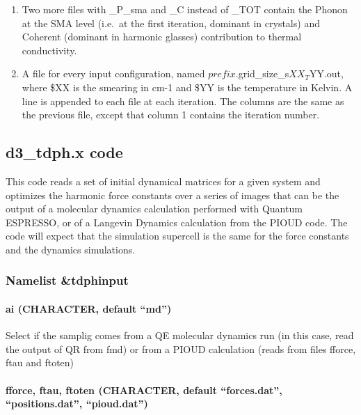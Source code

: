 \documentclass[
]{article}
\providecommand{\tightlist}{%
  \setlength{\itemsep}{0pt}\setlength{\parskip}{0pt}}
\begin{document}
\begin{enumerate}
\def\labelenumi{\arabic{enumi}.}
\setcounter{enumi}{1}
\tightlist
\item
  Two more files with \_P\_sma and \_C instead of \_TOT contain the
  Phonon at the SMA level (i.e.~at the first iteration, dominant in
  crystals) and Coherent (dominant in harmonic glasses) contribution to
  thermal conductivity.
\item
  A file for every input configuration, named
  \(prefix.\)grid\_size\_s\(XX_T\)YY.out, where \$XX is the smearing in
  cm-1 and \$YY is the temperature in Kelvin. A line is appended to each
  file at each iteration. The columns are the same as the previous file,
  except that column 1 contains the iteration number.
\end{enumerate}

\hypertarget{d3_tdph.x-code}{%
\subsection{d3\_tdph.x code}\label{d3_tdph.x-code}}

This code reads a set of initial dynamical matrices for a given system
and optimizes the harmonic force constants over a series of images that
can be the output of a molecular dynamics calculation performed with
Quantum ESPRESSO, or of a Langevin Dynamics calculation from the PIOUD
code. The code will expect that the simulation supercell is the same for
the force constants and the dynamics simulations.

\hypertarget{namelist-tdphinput}{%
\subsubsection{Namelist \&tdphinput}\label{namelist-tdphinput}}

\hypertarget{ai-character-default-md}{%
\paragraph{\texorpdfstring{ai (CHARACTER, default
\enquote{md})}{ai (CHARACTER, default ``md'')}}\label{ai-character-default-md}}

Select if the samplig comes from a QE molecular dynamics run (in this
case, read the output of QR from fmd) or from a PIOUD calculation (reads
from files fforce, ftau and ftoten)

\hypertarget{fforce-ftau-ftoten-character-default-forces.dat-positions.dat-pioud.dat}{%
\paragraph{\texorpdfstring{fforce, ftau, ftoten (CHARACTER, default
\enquote{forces.dat}, \enquote{positions.dat},
\enquote{pioud.dat})}{fforce, ftau, ftoten (CHARACTER, default ``forces.dat'', ``positions.dat'', ``pioud.dat'')}}\label{fforce-ftau-ftoten-character-default-forces.dat-positions.dat-pioud.dat}}
\end{document}
